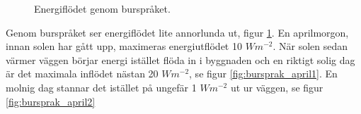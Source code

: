 \begin{figure}
\centering
{}

\caption{\label{fig:bursprak_energi}Energiflödet genom burspråket.}
\end{figure}

Genom burspråket ser energiflödet lite annorlunda ut, figur \ref{fig:bursprak_energi}. En aprilmorgon, innan solen har gått upp, maximeras energiutflödet 10 $\unit{W m^{-2}}$. När solen sedan värmer väggen börjar energi istället flöda in i byggnaden och en riktigt solig dag är det maximala inflödet nästan 20 $\unit{W m^{-2}}$, se figur \ref{fig:bursprak_april1}. En molnig dag stannar det istället på ungefär 1 $\unit{W m^{-2}}$ ut ur väggen, se figur \ref{fig:bursprak_april2}


